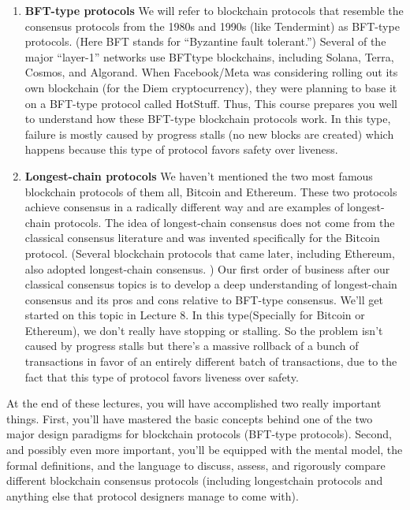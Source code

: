 \begin{enumerate}
    \item \textbf{BFT-type protocols} We will refer to blockchain protocols that resemble the consensus
    protocols from the 1980s and 1990s (like Tendermint) as BFT-type protocols. (Here BFT
    stands for “Byzantine fault tolerant.”) Several of the major “layer-1” networks use BFTtype blockchains, including Solana, Terra, Cosmos, and Algorand. When Facebook/Meta
    was considering rolling out its own blockchain (for the Diem cryptocurrency), they were
    planning to base it on a BFT-type protocol called HotStuff. Thus, This course prepares
    you well to understand how these BFT-type blockchain protocols work. In this type, failure is mostly caused by progress stalls (no new blocks are created) which happens because this type of protocol favors safety over liveness.

 \item \textbf{Longest-chain protocols} We haven't mentioned the two
    most famous blockchain protocols of them all, Bitcoin and Ethereum. These two protocols
    achieve consensus in a radically different way and are examples of longest-chain protocols.
    The idea of longest-chain consensus does not come from the classical consensus literature
    and was invented specifically for the Bitcoin protocol. (Several blockchain protocols that
    came later, including Ethereum, also adopted longest-chain consensus.
    ) Our first order
    of business after our classical consensus topics is to develop a deep understanding of
    longest-chain consensus and its pros and cons relative to BFT-type consensus. We’ll get
    started on this topic in Lecture 8. In this type(Specially for Bitcoin or Ethereum), we don't really have stopping or stalling. So the problem isn't caused by progress stalls but there's a massive rollback of a bunch of transactions in favor of an entirely different batch of transactions, due to the fact that this type of protocol favors liveness over safety.
\end{enumerate}

At the end of these lectures, you will have accomplished two really important things.
First, you’ll have mastered the basic concepts behind one of the two major design paradigms
for blockchain protocols (BFT-type protocols). Second, and possibly even more important,
you’ll be equipped with the mental model, the formal definitions, and the language to discuss,
assess, and rigorously compare different blockchain consensus protocols (including longestchain protocols and anything else that protocol designers manage to come with).\\


